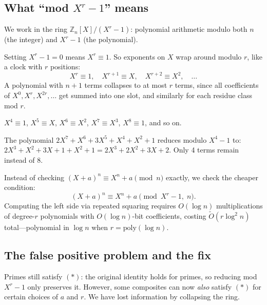 \documentclass[12pt]{article}
\newcommand{\Z}{\mathbb{Z}}
\newcommand{\OO}{\widetilde{O}}
\begin{document}
\subsection{What ``mod $X^r - 1$'' means}

We work in the ring $\Z_n[X]/(X^r-1)$: polynomial arithmetic modulo both $n$ (the integer) and $X^r-1$ (the polynomial).

Setting $X^r - 1 = 0$ means $X^r \equiv 1$. So exponents on $X$ wrap around modulo $r$, like a clock with $r$ positions:
\[
  X^r \equiv 1,\quad X^{r+1}\equiv X,\quad X^{r+2}\equiv X^2,\quad\ldots
\]
A polynomial with $n+1$ terms collapses to at most $r$ terms, since all coefficients of $X^0, X^r, X^{2r},\ldots$ get summed into one slot, and similarly for each residue class mod $r$.

\begin{exbox}[Clock example with $r=4$]
$X^4\equiv 1$, $X^5\equiv X$, $X^6\equiv X^2$, $X^7\equiv X^3$, $X^8\equiv 1$, and so on.

The polynomial $2X^7 + X^6 + 3X^5 + X^4 + X^2 + 1$ reduces modulo $X^4-1$ to:
$2X^3 + X^2 + 3X + 1 + X^2 + 1 = 2X^3 + 2X^2 + 3X + 2$.
Only 4 terms remain instead of 8.
\end{exbox}

Instead of checking $(X+a)^n \equiv X^n+a \pmod{n}$ exactly, we check the cheaper condition:
\begin{equation}
  (X+a)^n \equiv X^n + a \pmod{X^r-1,\; n}. \tag{$*$}
\end{equation}
Computing the left side via repeated squaring requires $O(\log n)$ multiplications of degree-$r$ polynomials with $O(\log n)$-bit coefficients, costing $\OO(r\log^2 n)$ total---polynomial in $\log n$ when $r = \mathrm{poly}(\log n)$.

\subsection{The false positive problem and the fix}

Primes still satisfy $(*)$: the original identity holds for primes, so reducing mod $X^r-1$ only preserves it. However, some composites can now \emph{also} satisfy $(*)$ for certain choices of $a$ and $r$. We have lost information by collapsing the ring.
\end{document}
